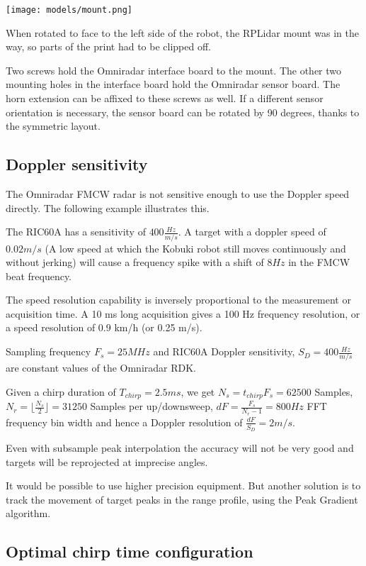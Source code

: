 \texttt{[image: models/mount.png]}

When rotated to face to the left side of the robot, the RPLidar mount
was in the way, so parts of the print had to be clipped off.

Two screws hold the Omniradar interface board to the mount. The other
two mounting holes in the interface board hold the Omniradar sensor
board. The horn extension can be affixed to these screws as well. If a
different sensor orientation is necessary, the sensor board can be
rotated by 90 degrees, thanks to the symmetric layout.

\subsection{Doppler sensitivity}\label{doppler-sensitivity}

The Omniradar FMCW radar is not sensitive enough to use the Doppler
speed directly. The following example illustrates this.

The RIC60A has a sensitivity of \(400 \frac{Hz}{m/s}\). A target with a
doppler speed of \(0.02 m/s\) (A low speed at which the Kobuki robot
still moves continuously and without jerking) will cause a frequency
spike with a shift of \(8Hz\) in the FMCW beat frequency.

The speed resolution capability is inversely proportional to the
measurement or acquisition time. A 10 ms long acquisition gives a 100 Hz
frequency resolution, or a speed resolution of 0.9 km/h (or 0.25 m/s).

Sampling frequency \(F_s=25MHz\) and RIC60A Doppler sensitivity,
\(S_D = 400 \frac{Hz}{m/s}\) are constant values of the Omniradar RDK.

Given a chirp duration of \(T_{chirp} = 2.5ms\), we get
\(N_s = t_{chirp} F_s = 62500\) Samples,
\(N_r = \lfloor \frac{N_s}{2} \rfloor = 31250\) Samples per
up/downsweep, \(dF = \frac{F_s}{N_r - 1} = 800 Hz\) FFT frequency bin
width and hence a Doppler resolution of \(\frac{dF}{S_D} = 2 m/s\).

Even with subsample peak interpolation the accuracy will not be very
good and targets will be reprojected at imprecise angles.

It would be possible to use higher precision equipment. But another
solution is to track the movement of target peaks in the range profile,
using the Peak Gradient algorithm.

\subsection{Optimal chirp time
configuration}\label{optimal-chirp-time-configuration}

